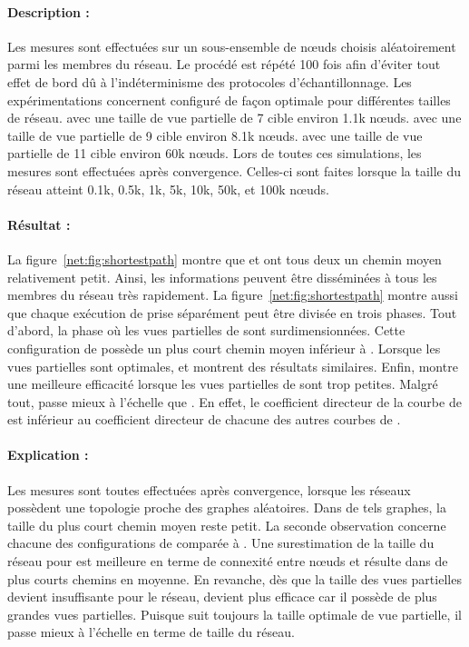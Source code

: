 \paragraph{Description :} Les mesures sont effectuées sur un sous-ensemble de
nœuds choisis aléatoirement parmi les membres du réseau. Le procédé est répété
100 fois afin d'éviter tout effet de bord dû à l'indéterminisme des protocoles
d'échantillonnage. Les expérimentations concernent \CYCLON configuré de façon
optimale pour différentes tailles de réseau. \CYCLON avec une taille de vue
partielle de 7 cible environ 1.1k nœuds.  \CYCLON avec une taille de vue
partielle de 9 cible environ 8.1k nœuds.  \CYCLON avec une taille de vue
partielle de 11 cible environ 60k nœuds. Lors de toutes ces simulations, les
mesures sont effectuées après convergence. Celles-ci sont faites lorsque la
taille du réseau atteint 0.1k, 0.5k, 1k, 5k, 10k, 50k, et 100k nœuds.

\paragraph{Résultat :} La figure~\ref{net:fig:shortestpath} montre que \CYCLON
et \SPRAY ont tous deux un chemin moyen relativement petit. Ainsi, les
informations peuvent être disséminées à tous les membres du réseau très
rapidement. La figure~\ref{net:fig:shortestpath} montre aussi que chaque
exécution de \CYCLON prise séparément peut être divisée en trois phases.  Tout
d'abord, la phase où les vues partielles de \CYCLON sont surdimensionnées. Cette
configuration de \CYCLON possède un plus court chemin moyen inférieur à
\SPRAY. Lorsque les vues partielles sont optimales, \CYCLON et \SPRAY montrent
des résultats similaires. Enfin, \SPRAY montre une meilleure efficacité lorsque
les vues partielles de \CYCLON sont trop petites. Malgré tout, \SPRAY passe
mieux à l'échelle que \CYCLON. En effet, le coefficient directeur de la courbe
de \SPRAY est inférieur au coefficient directeur de chacune des autres courbes
de \CYCLON.

\paragraph{Explication :} Les mesures sont toutes effectuées après convergence,
lorsque les réseaux possèdent une topologie proche des graphes aléatoires.  Dans
de tels graphes, la taille du plus court chemin moyen reste petit.  La seconde
observation concerne chacune des configurations de \CYCLON comparée à
\SPRAY. Une surestimation de la taille du réseau pour \CYCLON est meilleure en
terme de connexité entre nœuds et résulte dans de plus courts chemins en
moyenne. En revanche, dès que la taille des vues partielles devient insuffisante
pour le réseau, \SPRAY devient plus efficace car il possède de plus grandes vues
partielles. Puisque \SPRAY suit toujours la taille optimale de vue partielle, il
passe mieux à l'échelle en terme de taille du réseau.


